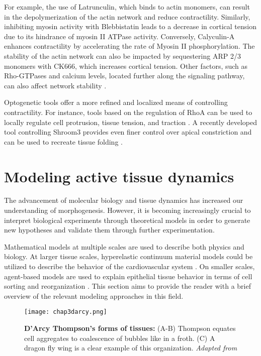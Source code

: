For example, the use of Latrunculin, which binds to actin monomers, can result in the depolymerization of the actin network and reduce contractility. Similarly, inhibiting myosin activity with Blebbistatin leads to a decrease in cortical tension due to its hindrance of myosin II ATPase activity. Conversely, Calyculin-A enhances contractility by accelerating the rate of Myosin II phosphorylation. The stability of the actin network can also be impacted by sequestering ARP 2/3 monomers with CK666, which increases cortical tension. Other factors, such as Rho-GTPases and calcium levels, located further along the signaling pathway, can also affect network stability \cite{valon2017}.

Optogenetic tools offer a more refined and localized means of controlling contractility. For instance, tools based on the regulation of RhoA can be used to locally regulate cell protrusion, tissue tension, and traction \cite{valon2017}. A recently developed tool controlling Shroom3 provides even finer control over apical constriction and can be used to recreate tissue folding \cite{martinez-ara2022}.

\hypertarget{modeling-active-tissue-dynamics}{%
	\section{Modeling active tissue
		dynamics}\label{modeling-active-tissue-dynamics}}

The advancement of molecular biology and tissue dynamics has increased our understanding of morphogenesis. However, it is becoming increasingly crucial to interpret biological experiments through theoretical models in order to generate new hypotheses and validate them through further experimentation.

Mathematical models at multiple scales are used to describe both physics and biology. At larger tissue scales, hyperelastic continuum material models could be utilized to describe the behavior of the cardiovascular system \cite{holzapfel2019}. On smaller scales, agent-based models are used to explain epithelial tissue behavior in terms of cell sorting and reorganization \cite{voss-bohme2012}. This section aims to provide the reader with a brief overview of the relevant modeling approaches in this field.

\begin{figure}
	\centering
	\texttt{[image: chap3darcy.png]}
	\caption{\label{fig_3_6} \textbf{D'Arcy Thompson's forms of tissues:} (A-B) Thompson equates cell aggregates to coalescence of bubbles like in a froth. (C) A dragon fly wing is a clear example of this organization. \textit{Adapted from \cite{thompson1979}}
	}
\end{figure}

